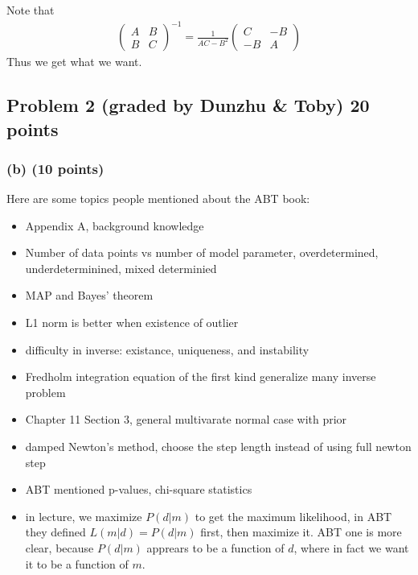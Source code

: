 \documentclass[11pt]{article}
\begin{document}
Note that 
\begin{eqnarray*}
\begin{pmatrix}
A & B \\
B & C
\end{pmatrix}^{-1} 
= \frac{1}{AC-B^2}\begin{pmatrix}
C & -B \\
-B & A
\end{pmatrix}
\end{eqnarray*}
Thus we get what we want.

\subsection*{Problem 2 (graded by Dunzhu \& Toby) 20 points}
\subsubsection*{(b) (10 points)}
Here are some topics people mentioned about the ABT book:
\begin{itemize}
\item Appendix A, background knowledge
\item Number of data points vs number of model parameter, overdetermined, underdeterminined, mixed determinied
\item MAP and Bayes' theorem
\item L1 norm is better when existence of outlier
\item difficulty in inverse: existance, uniqueness, and instability
\item Fredholm integration equation of the first kind generalize many inverse problem
\item Chapter 11 Section 3, general multivarate normal case with prior
\item damped Newton's method, choose the step length instead of using full newton step
\item ABT mentioned p-values, chi-square statistics
\item in lecture, we maximize $P(d|m)$ to get the maximum likelihood, in ABT they defined $L(m|d) = P(d|m)$ first, then maximize it. ABT one is more clear, because $P(d|m)$ apprears to be a function of $d$, where in fact we want it to be a function of $m$. 
\end{itemize}
\end{document}
